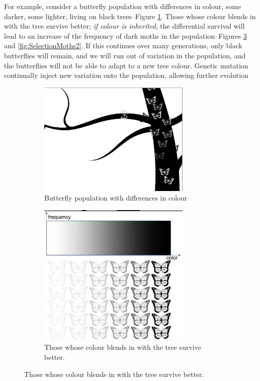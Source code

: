 \documentclass[]{article}
\begin{document}
For example, consider a butterfly population with differences in colour, some darker, some lighter, living on black trees--Figure \ref{fig:SelectionMoths0}. Those whose colour blends in with the tree survive better; \emph{ if colour is inherited}, the differential survival will lead to an increase of the frequency of dark moths in the population--Figures \ref{fig:SelectionMoths1} and  \ref{fig:SelectionMoths2}. If this continues over many generations, only black butterflies will remain, and we will run out of variation in the population, and the butterflies will not be able to adapt to a new tree colour. Genetic mutation continually inject new variation onto the population, allowing further evolution
\begin{figure}[H]
	\caption{Example of natural selection--light and dark butterflies}\label{fig:SelectionMoths}
	\begin{subfigure}[t]{0.3\textwidth}
		\caption{Butterfly population with differences in colour}\label{fig:SelectionMoths0}
		\includegraphics[width=0.8\textwidth]{SelectionMoths}
	\end{subfigure}
	\;\;\;
	\begin{subfigure}[t]{0.3\textwidth}
		\caption{Those whose colour blends in with the tree survive better.}\label{fig:SelectionMoths1}
		\includegraphics[width=0.8\textwidth]{SelectionMoths1}

\end{subfigure}
\end{figure}
\end{document}
